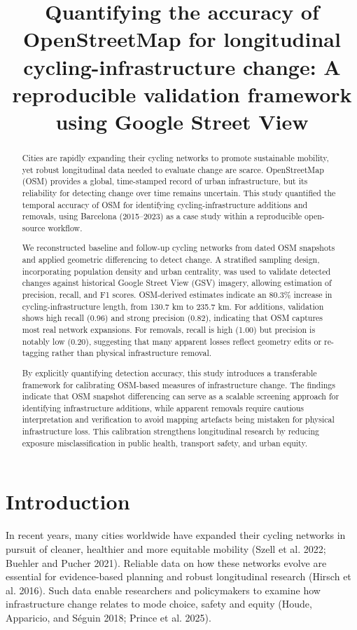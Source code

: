 \documentclass[
]{article}
\title{Quantifying the accuracy of OpenStreetMap for longitudinal
cycling-infrastructure change: A reproducible validation framework using
Google Street View}
\author{}
\date{}
\begin{document}
\maketitle
\begin{abstract}
Cities are rapidly expanding their cycling networks to promote
sustainable mobility, yet robust longitudinal data needed to evaluate
change are scarce. OpenStreetMap (OSM) provides a global, time-stamped
record of urban infrastructure, but its reliability for detecting change
over time remains uncertain. This study quantified the temporal accuracy
of OSM for identifying cycling-infrastructure additions and removals,
using Barcelona (2015--2023) as a case study within a reproducible
open-source workflow.

We reconstructed baseline and follow-up cycling networks from dated OSM
snapshots and applied geometric differencing to detect change. A
stratified sampling design, incorporating population density and urban
centrality, was used to validate detected changes against historical
Google Street View (GSV) imagery, allowing estimation of precision,
recall, and F1 scores. OSM-derived estimates indicate an 80.3\% increase
in cycling-infrastructure length, from 130.7 km to 235.7 km. For
additions, validation shows high recall (0.96) and strong precision
(0.82), indicating that OSM captures most real network expansions. For
removals, recall is high (1.00) but precision is notably low (0.20),
suggesting that many apparent losses reflect geometry edits or
re-tagging rather than physical infrastructure removal.

By explicitly quantifying detection accuracy, this study introduces a
transferable framework for calibrating OSM-based measures of
infrastructure change. The findings indicate that OSM snapshot
differencing can serve as a scalable screening approach for identifying
infrastructure additions, while apparent removals require cautious
interpretation and verification to avoid mapping artefacts being
mistaken for physical infrastructure loss. This calibration strengthens
longitudinal research by reducing exposure misclassification in public
health, transport safety, and urban equity.
\end{abstract}


\section{Introduction}\label{introduction}

In recent years, many cities worldwide have expanded their cycling
networks in pursuit of cleaner, healthier and more equitable mobility
(Szell et al. 2022; Buehler and Pucher 2021). Reliable data on how these
networks evolve are essential for evidence-based planning and robust
longitudinal research (Hirsch et al. 2016). Such data enable researchers
and policymakers to examine how infrastructure change relates to mode
choice, safety and equity (Houde, Apparicio, and Séguin 2018; Prince et
al. 2025).
\end{document}
